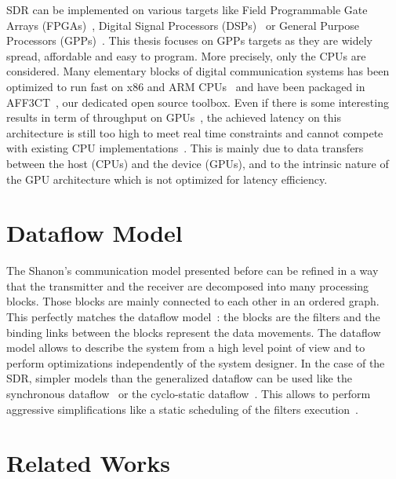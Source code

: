 SDR can be implemented on various targets like Field Programmable Gate Arrays
(FPGAs)~\cite{Coulton2004,Skey2006,Dutta2010,Shaik2013,Maheshwarappa2015,
Nivin2016}, Digital Signal Processors (DSPs)~\cite{Kaur2008,Karlsson2013,
Shaik2013} or General Purpose Processors (GPPs)~\cite{Yoge2012,Bang2014,
Meshram2019,Grayver2020}. This thesis focuses on GPPs targets as they are widely
spread, affordable and easy to program. More precisely, only the CPUs are
considered. Many elementary blocks of digital communication systems has been
optimized to run fast on x86 and ARM CPUs~\cite{Cassagne2015c,Cassagne2016a,
Cassagne2016b,Cassagne2018,Leonardon2019,Ghaffari2019} and have been packaged in
AFF3CT~\cite{Cassagne2017a,Cassagne2019a}, our dedicated open source toolbox.
Even if there is some interesting results in term of throughput on
GPUs~\cite{Xianjun2013,Li2014,LeGal2014a,Giard2016b,Keskin2017a}, the achieved
latency on this architecture is still too high to meet real time constraints and
cannot compete with existing CPU implementations~\cite{LeGal2015a,Cassagne2015c,
Giard2016b,Cassagne2016a,LeGal2017,Leonardon2019,LeGal2019a}. This is mainly due
to data transfers between the host (CPUs) and the device (GPUs), and to the
intrinsic nature of the GPU architecture which is not optimized for latency
efficiency.

\section{Dataflow Model}

The Shanon's communication model presented before can be refined in a way
that the transmitter and the receiver are decomposed into many processing
blocks. Those blocks are mainly connected to each other in an ordered graph.
This perfectly matches the dataflow model~\cite{Dennis1980,Ackerman1982}: the
blocks are the filters and the binding links between the blocks represent the
data movements. The dataflow model allows to describe the system from a high
level point of view and to perform optimizations independently of the system
designer. In the case of the SDR, simpler models than the generalized dataflow
can be used like the synchronous dataflow~\cite{Lee1987} or the cyclo-static
dataflow~\cite{Engels1994,Bilsen1995}. This allows to perform aggressive
simplifications like a static scheduling of the filters
execution~\cite{Parks1995}.

\section{Related Works}

